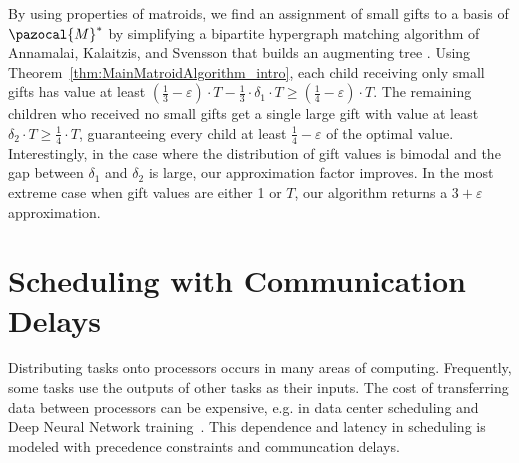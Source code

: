 By using properties of matroids, we find an assignment of small gifts to a basis of $\pazocal{M}^*$ by
simplifying a bipartite hypergraph matching algorithm
of Annamalai, Kalaitzis, and Svensson that builds an augmenting tree \cite{AlgoForSantaClaus-AnnamalaiKalaitzisSvenssonSODA15}.
Using Theorem~\ref{thm:MainMatroidAlgorithm_intro}, each child receiving only small gifts has value at least
$\left (\frac13 - \varepsilon \right ) \cdot T - \frac13 \cdot \delta_1 \cdot T \geq \left (\frac14 - \varepsilon \right ) \cdot T$. 
The remaining children who received no small gifts get a single large gift with value at least $\delta_2 \cdot T \geq \frac14 \cdot T$,
guaranteeing every child at least $\frac14 - \varepsilon$ of the optimal value.
Interestingly, in the case where the distribution of gift values is bimodal and the gap between $\delta_1$ and $\delta_2$ is large, 
our approximation factor improves.
In the most extreme case when gift values are either 1 or $T$, 
our algorithm returns a $3 + \varepsilon$ approximation. 









\section{Scheduling with Communication Delays} 


Distributing tasks onto processors occurs in many areas of computing.
Frequently, some tasks use the outputs of other tasks as their inputs. 
The cost of transferring data between processors can be expensive, 
e.g. in data center scheduling and Deep Neural Network training~\cite{coflow, zhao2015rapier}. 
This dependence and latency in scheduling is modeled with precedence constraints and communcation delays.

